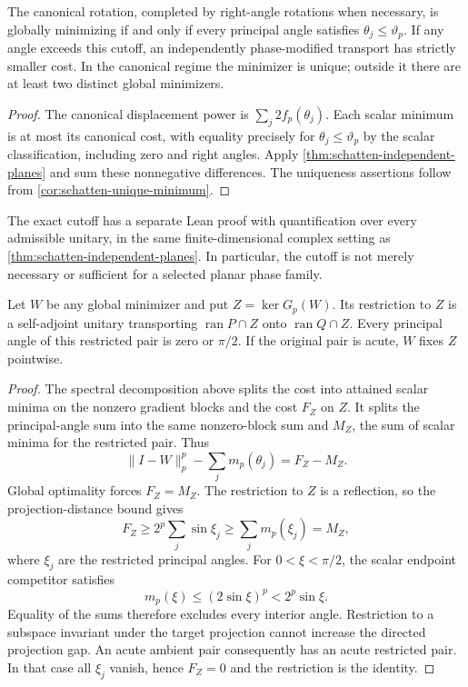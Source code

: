 \begin{corollary}
\label{cor:schatten-canonical-cutoff}
The canonical rotation, completed by right-angle rotations when necessary,
is globally minimizing if and only if every principal angle satisfies
$\theta_j\leq\vartheta_p$. If any angle exceeds this cutoff, an
independently phase-modified transport has strictly smaller cost.
In the canonical regime the minimizer is unique; outside it there are
at least two distinct global minimizers.
\end{corollary}

\begin{proof}
The canonical displacement power is $\sum_j 2f_p(\theta_j)$.
Each scalar minimum is at most its canonical cost, with equality precisely
for $\theta_j\leq\vartheta_p$ by the scalar classification, including
zero and right angles. Apply \cref{thm:schatten-independent-planes} and
sum these nonnegative differences.
The uniqueness assertions follow from
\cref{cor:schatten-unique-minimum}.
\end{proof}

The exact cutoff has a separate Lean proof with quantification over
every admissible unitary, in the same finite-dimensional complex setting
as \cref{thm:schatten-independent-planes}. In particular, the cutoff is
not merely necessary or sufficient for a selected planar phase family.

\begin{proposition}
\label{prop:schatten-optimal-kernel}
Let $W$ be any global minimizer and put $Z=\ker G_p(W)$.
Its restriction to $Z$ is a self-adjoint unitary transporting
$\operatorname{ran}P\cap Z$ onto $\operatorname{ran}Q\cap Z$.
Every principal angle of this restricted pair is zero or $\pi/2$.
If the original pair is acute, $W$ fixes $Z$ pointwise.
\end{proposition}

\begin{proof}
The spectral decomposition above splits the cost into attained scalar
minima on the nonzero gradient blocks and the cost $F_Z$ on $Z$.
It splits the principal-angle sum into the same nonzero-block sum and
$M_Z$, the sum of scalar minima for the restricted pair. Thus
\[
 \|I-W\|_p^p-\sum_j m_p(\theta_j)=F_Z-M_Z.
\]
Global optimality forces $F_Z=M_Z$. The restriction to $Z$ is a
reflection, so the projection-distance bound gives
\[
 F_Z\geq2^p\sum_j\sin\xi_j\geq\sum_jm_p(\xi_j)=M_Z,
\]
where $\xi_j$ are the restricted principal angles. For
$0<\xi<\pi/2$, the scalar endpoint competitor satisfies
\[
 m_p(\xi)\leq(2\sin\xi)^p<2^p\sin\xi.
\]
Equality of the sums therefore excludes every interior angle.
Restriction to a subspace invariant under the target projection cannot
increase the directed projection gap. An acute ambient pair consequently
has an acute restricted pair. In that case all $\xi_j$ vanish, hence
$F_Z=0$ and the restriction is the identity.
\end{proof}

